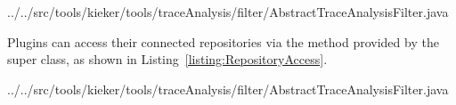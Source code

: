 \setJavaCodeListing
%
{../../src/tools/kieker/tools/traceAnalysis/filter/AbstractTraceAnalysisFilter.java}

\noindent Plugins can access their connected repositories via the  %
method provided by the super class, as shown in Listing~\ref{listing:RepositoryAccess}. %

\setJavaCodeListing
%
{../../src/tools/kieker/tools/traceAnalysis/filter/AbstractTraceAnalysisFilter.java}

